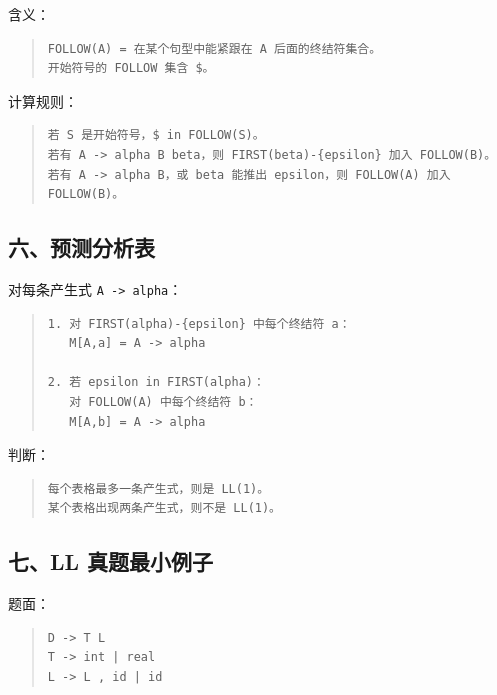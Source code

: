 \documentclass[UTF8,zihao=-4]{ctexart}
\begin{document}
含义：


\begin{quote}
\footnotesize
\begin{verbatim}
FOLLOW(A) = 在某个句型中能紧跟在 A 后面的终结符集合。
开始符号的 FOLLOW 集含 $。
\end{verbatim}
\end{quote}


计算规则：


\begin{quote}
\footnotesize
\begin{verbatim}
若 S 是开始符号，$ in FOLLOW(S)。
若有 A -> alpha B beta，则 FIRST(beta)-{epsilon} 加入 FOLLOW(B)。
若有 A -> alpha B，或 beta 能推出 epsilon，则 FOLLOW(A) 加入 FOLLOW(B)。
\end{verbatim}
\end{quote}


\subsection{六、预测分析表}


对每条产生式 \texttt{A -> alpha}：


\begin{quote}
\footnotesize
\begin{verbatim}
1. 对 FIRST(alpha)-{epsilon} 中每个终结符 a：
   M[A,a] = A -> alpha

2. 若 epsilon in FIRST(alpha)：
   对 FOLLOW(A) 中每个终结符 b：
   M[A,b] = A -> alpha
\end{verbatim}
\end{quote}


判断：


\begin{quote}
\footnotesize
\begin{verbatim}
每个表格最多一条产生式，则是 LL(1)。
某个表格出现两条产生式，则不是 LL(1)。
\end{verbatim}
\end{quote}


\subsection{七、LL 真题最小例子}


题面：


\begin{quote}
\footnotesize
\begin{verbatim}
D -> T L
T -> int | real
L -> L , id | id
\end{verbatim}
\end{quote}
\end{document}
